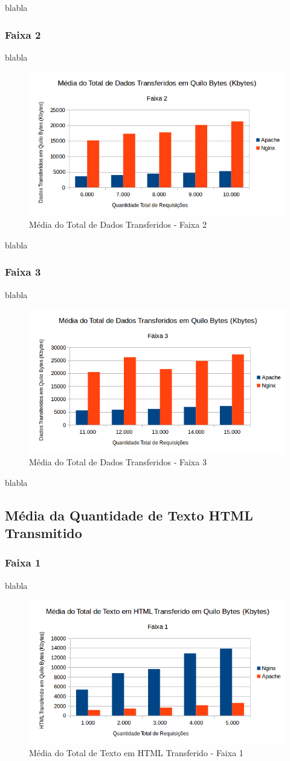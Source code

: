 blabla

\subsubsection{Faixa 2}
blabla

\begin{figure}[htb]
	\centering
	\includegraphics[width=0.6\linewidth]{graficos/grafico2-f2} 
	\caption{Média do Total de Dados Transferidos - Faixa 2}
	\label{fig:grafico2-f2}
\end{figure}
blabla

\subsubsection{Faixa 3}
blabla

\begin{figure}[htb]
	\centering
	\includegraphics[width=0.6\linewidth]{graficos/grafico2-f3} 
	\caption{Média do Total de Dados Transferidos - Faixa 3}
	\label{fig:grafico2-f3}
\end{figure}
blabla

\subsection{Média da Quantidade de Texto HTML Transmitido}
\subsubsection{Faixa 1}

blabla
\begin{figure}[htb]
	\centering
	\includegraphics[width=0.6\linewidth]{graficos/grafico3-f1} 
	\caption{Média do Total de Texto em HTML Transferido - Faixa 1}
	\label{fig:grafico3-f1}
\end{figure}

